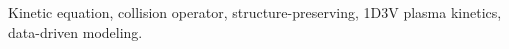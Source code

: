\documentclass[preprint,1p,times]{elsarticle}
\newcommand{\cO}{\mathcal{O}}
\theoremstyle{definition}
\theoremstyle{remark}
\begin{document}
\begin{frontmatter}
\begin{abstract}

\end{abstract}



\begin{keyword}
Kinetic equation, collision operator, structure-preserving, 1D3V plasma kinetics, data-driven modeling.
\end{keyword}

\end{frontmatter}

\end{document}
